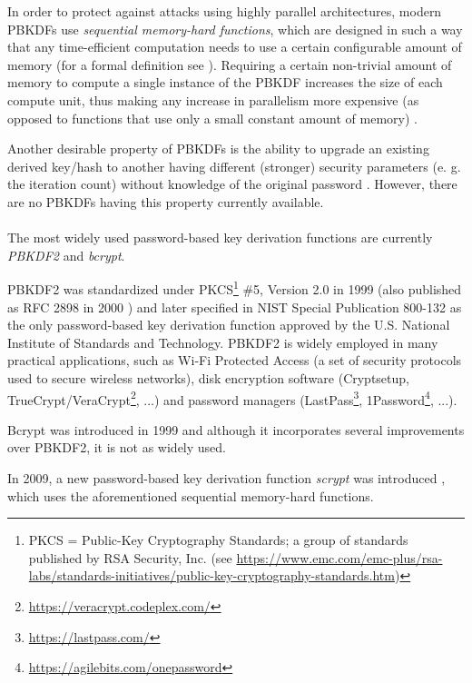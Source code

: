 \documentclass[12pt,oneside]{fithesis2}
\begin{document}
      \label{p:memoryHard}
      In order to protect against attacks using highly parallel architectures, modern PBKDFs use \emph{sequential memory-hard functions}, which are designed in such a way that any time-efficient computation needs to use a certain configurable amount of memory (for a formal definition see \cite[chapter 4]{scrypt}). Requiring a certain non-trivial amount of memory to compute a single instance of the PBKDF increases the size of each compute unit, thus making any increase in parallelism more expensive (as opposed to functions that use only a small constant amount of memory) \cite{scrypt}.
      
      Another desirable property of PBKDFs is the ability to upgrade an existing derived key/hash to another having different (stronger) security parameters (e. g. the iteration count) without knowledge of the original password \cite{openwall:pwHashing}. However, there are no PBKDFs having this property currently available.
      
      \paragraph*{}
      The most widely used password-based key derivation functions are currently \emph{PBKDF2} and \emph{bcrypt}.
      
      PBKDF2 was standardized under PKCS\footnote{PKCS = Public-Key Cryptography Standards; a group of standards published by RSA Security, Inc. (see \url{https://www.emc.com/emc-plus/rsa-labs/standards-initiatives/public-key-cryptography-standards.htm})} \#5, Version 2.0 in 1999 (also published as RFC 2898 in 2000 \cite{rfc2898}) and later specified in NIST Special Publication 800-132 \cite{nist:sp800:132} as the only password-based key derivation function approved by the U.S. National Institute of Standards and Technology. PBKDF2 is widely employed in many practical applications, such as Wi-Fi Protected Access (a set of security protocols used to secure wireless networks), disk encryption software (Cryptsetup, TrueCrypt/VeraCrypt\footnote{\url{https://veracrypt.codeplex.com/}}, ...) and password managers (LastPass\footnote{\url{https://lastpass.com/}}, 1Password\footnote{\url{https://agilebits.com/onepassword}}, ...).
      
      Bcrypt was introduced in 1999 \cite{bcrypt} and although it incorporates several improvements over PBKDF2, it is not as widely used.
      
      In 2009, a new password-based key derivation function \emph{scrypt} was introduced \cite{scrypt}, which uses the aforementioned sequential memory-hard functions.
      
\end{document}
